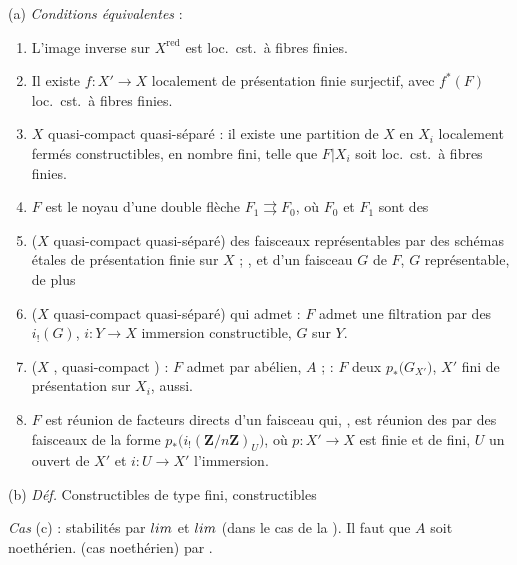 \documentclass[11pt,a4paper]{article}
\begin{document}
(a) \emph{Conditions équivalentes} :
\begin{enumerate}
\item[(i)] L'image inverse sur $X^{\mathrm{red}}$ est loc.\ cst.\ à fibres
  finies.
\item[(ii)] Il existe $f : X' \to X$ localement de présentation finie
  surjectif, avec $f^{*}(F)$ loc.\ cst.\ à fibres finies.
\item[(iii)]  $X$ quasi-compact quasi-séparé : il existe une
  partition de $X$ en $X_i$ localement fermés constructibles, en nombre fini,
  telle que $F|X_i$ soit loc.\ cst.\ à fibres finies.
\item[(iv)]  $F$ est le noyau d'une
  double flèche $F_1 \rightrightarrows F_0$, où $F_0$ et $F_1$ sont des
  \ill{}
\item[(v)] ($X$ quasi-compact quasi-séparé) \ill{} des faisceaux représentables
  par des schémas étales de présentation finie sur $X$ ; , et \ill{} d'un faisceau \ill{}
  $G$ de $F$, \ill{} $G$ \ill{} représentable, \ill{} de plus \ill{}
\item[(vi)] ($X$ quasi-compact quasi-séparé) qui admet \ill{} : $F$ admet une
  filtration \ill{} par des $i_{!}(G)$, $i : Y \to X$ immersion
  \struck{\ill{}} constructible, $G$ \ill{} sur $Y$.
\item[(vii)] ($X$ \ill{}, quasi-compact \ill{}) : $F$ admet \ill{} par
  \ill{} abélien, $A$ \ill{} ; \ill{} : $F$ \ill{} deux \ill{}
  $p_{*}\bigl( G_{X'} \bigr)$, $X'$ fini de présentation \ill{} sur $X_i$,
  \ill{} aussi.
\item[(viii)]  \ill{} $F$ est réunion \ill{} de facteurs
  directs \ill{} d'un faisceau qui, \ill{}, est réunion des
  \ill{} par des faisceaux de la forme
  $p_{*}\bigl( i_{!} (\mathbf{Z}/n\mathbf{Z})_{U} \bigr)$, où
  $p : X' \to X$ est \ill{} finie et de \ill{} fini, $U$ un ouvert de $X'$ et
  $i : U \to X'$ l'immersion.
\end{enumerate}


(b) \emph{Déf.} Constructibles de type fini, \ill{} constructibles

\emph{Cas} (c) : stabilités par $\varinjlim$ et $\varprojlim$ \ill{} (dans le
cas de la \ill{}). Il faut \struck{\ill{}} que $A$ soit noethérien.
\ill{} (cas noethérien) \ill{} par .
\end{document}
